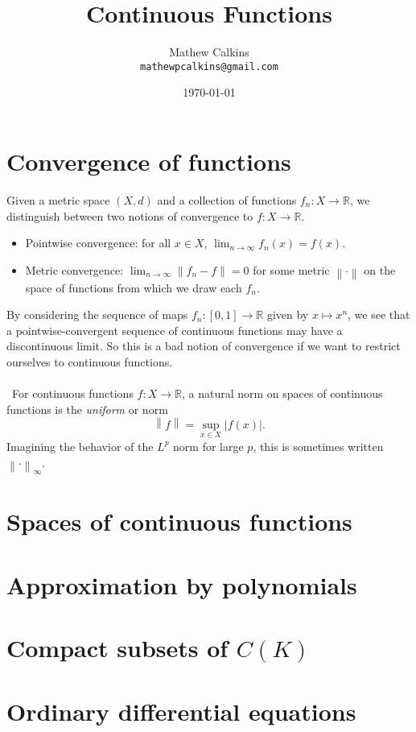 \documentclass[12 pt]{article}
\newcommand{\R}{\mathbb{R}}
\newcommand{\nm}[1]{\left\| #1 \right\|}
\numberwithin{equation}{section}
\begin{document}
\title{Continuous Functions}
\author{Mathew Calkins\\
  \texttt{mathewpcalkins@gmail.com}}

\date{\today}

\maketitle


\section{Convergence of functions}

Given a metric space $(X, d)$ and a collection of functions $f_n: X \to \R$, we distinguish between two notions of convergence to $f: X \to \R$. \begin{itemize}
\item Pointwise convergence: for all $x \in X$, $\lim_{n \to \infty} f_n(x) = f(x)$.
\item Metric convergence: $\lim_{n \to \infty} \nm{f_n - f} = 0$ for some metric $\nm{\cdot}$ on the space of functions from which we draw each $f_n$.
\end{itemize}
By considering the sequence of maps $f_n: [0,1] \to \R$ given by $x \mapsto x^n$, we see that a pointwise-convergent sequence of continuous functions may have a discontinuous limit. So this is a bad notion of convergence if we want to restrict ourselves to continuous functions.\\
\\
\
For continuous functions $f: X \to \R$, a natural norm on spaces of continuous functions is the \textit{uniform} or  norm \begin{equation*}
\nm{f} = \sup _{x \in X} |f(x)|.
\end{equation*}
Imagining the behavior of the $L^p$ norm for large $p$, this is sometimes written $\nm{\cdot}_\infty$.





\section{Spaces of continuous functions}









\section{Approximation by polynomials}











\section{Compact subsets of $C(K)$}







\section{Ordinary differential equations}
\end{document}
